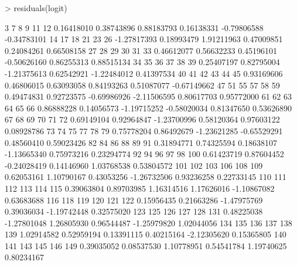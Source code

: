 \documentclass{article}
\begin{document}
\begin{Schunk}
\begin{Sinput}
> residuals(logit)
\end{Sinput}
\begin{Soutput}
          3           7           8           9          11          12 
 0.16418010  0.38743896  0.88183793  0.16138331 -0.79806588 -0.34783101 
         14          17          18          21          23          26 
-1.27817393  0.18993479  1.91211963  0.47009851  0.24084261  0.66508158 
         27          28          29          30          31          33 
 0.46612077  0.56632233  0.45196101 -0.50626160  0.86255313  0.88515134 
         34          35          36          37          38          39 
 0.25407197  0.82795004 -1.21375613  0.62542921 -1.22484012  0.41397534 
         40          41          42          43          44          45 
 0.93169606  0.46806015  0.63093058  0.84193263  0.51087077 -0.67149662 
         47          51          55          57          58          59 
 0.49474831  0.92723575 -0.69986926 -2.11506595  0.80617703  0.95772000 
         61          62          63          64          65          66 
 0.86888228  0.14056573 -1.19715252 -0.58020034  0.81347650  0.53626890 
         67          68          69          70          71          72 
 0.69149104  0.92964847 -1.23700996  0.58120364  0.97603122  0.08928786 
         73          74          75          77          78          79 
 0.75778204  0.86492679 -1.23621285 -0.65529291  0.48560410  0.59023426 
         82          84          86          88          89          91 
 0.31894771  0.74325594  0.18638107 -1.13665340  0.75973216  0.23294774 
         92          94          96          97          98         100 
 0.61423719  0.87604452 -0.24028419  0.14146960  1.03768538  0.53804572 
        101         102         103         106         108         109 
 0.62053161  1.10790167  0.43053256 -1.26732506  0.93236258  0.22733145 
        110         111         112         113         114         115 
 0.39063804  0.89703985  1.16314516  1.17626016 -1.10867082  0.63683688 
        116         118         119         120         121         122 
 0.15956435  0.21663286 -1.47975769  0.39036034 -1.19742448  0.32575020 
        123         125         126         127         128         131 
 0.48225038 -1.27801048  1.26805930  0.96544487 -1.25979820  1.02044056 
        134         135         136         137         138         139 
 1.02914582  0.52959194  0.13391115  0.40215164 -2.12305620  0.15365805 
        140         141         143         145         146         149 
 0.39035052  0.08537530  1.10778951  0.54541784  1.19740625  0.80234167 

\end{Soutput}
\end{Schunk}
\end{document}

